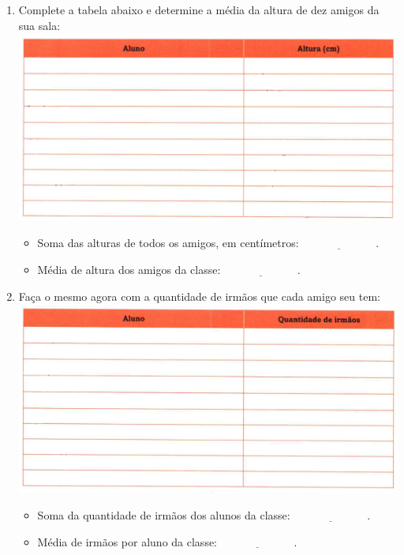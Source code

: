 \documentclass[a4paper,14pt]{article}
\begin{document}
	\begin{enumerate} 
		\item Complete a tabela abaixo e determine a média da altura de dez amigos da sua sala: \\
		\includegraphics[width=1\linewidth]{6FMA12_imagens/imagem1}
		\begin{itemize}
			\item Soma das alturas de todos os amigos, em centímetros: $\underline{~~~~~~~~~~~~~~~~~~~~~~~~~~~~~~}$.
			\item Média de altura dos amigos da classe: $\underline{~~~~~~~~~~~~~~~~~~~~~~~~~~~~~~}$. \newpage
		\end{itemize}
		\item Faça o mesmo agora com a quantidade de irmãos que cada amigo seu tem: \\
		\includegraphics[width=1\linewidth]{6FMA12_imagens/imagem2}
		\begin{itemize}
			\item Soma da quantidade de irmãos dos alunos da classe: $\underline{~~~~~~~~~~~~~~~~~~~~~~~~~~~~~~}$.
			\item Média de irmãos por aluno da classe: $\underline{~~~~~~~~~~~~~~~~~~~~~~~~~~~~~~}$. \newpage
		\end{itemize}

\end{enumerate}
\end{document}

